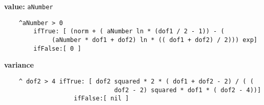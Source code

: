{\bf value:} {\tt aNumber}
\begin{verbatim}
    ^aNumber > 0
        ifTrue: [ (norm + ( aNumber ln * (dof1 / 2 - 1)) - ( 
             (aNumber * dof1 + dof2) ln * (( dof1 + dof2) / 2))) exp]
        ifFalse:[ 0 ]
\end{verbatim}
{\bf variance}
\begin{verbatim}
    ^ dof2 > 4 ifTrue: [ dof2 squared * 2 * ( dof1 + dof2 - 2) / ( ( 
                              dof2 - 2) squared * dof1 * ( dof2 - 4))]
                   ifFalse:[ nil ]
\end{verbatim}

